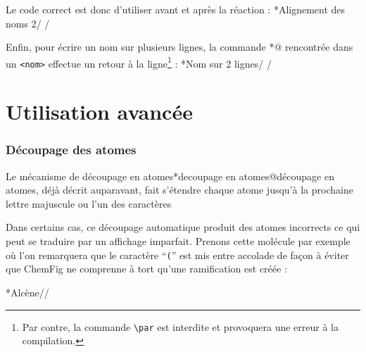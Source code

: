\documentclass[10pt]{article}
\makeatletter
\newcommand\idx{\@ifstar{\let\print@or@not\@gobble\idx@}{\let\print@or@not\@firstofone\idx@}}
\newcommand\idx@[1]{%
	\ifcat\expandafter\noexpand\@car#1\@nil\relax%
		\expandafter\ifx\@car#1\@nil\protect
			\index{#1}%
			\print@or@not{#1}%
		\else
			\saveexpandmode\expandarg
			\StrSubstitute{\string#1}{\string @}{\@empty\protect\symbol{'100}}[\temp@]%
			\StrGobbleLeft\temp@1[\temp@]%
			\restoreexpandmode
			\expandafter\index\expandafter{\temp@ @\protect\texttt{\protect\textbackslash\temp@}}%
			\print@or@not{\texttt{\string#1}}%
		\fi
	\else
		\index{#1}%
		\print@or@not{#1}%
	\fi
}
\newcommand\make@car@active[1]{%
	\catcode`#1\active
	\begingroup
		\lccode`\~`#1\relax
		\lowercase{\endgroup\def~}%
}
\newif\if@exstar
\newcommand\exemple{%
	\begingroup
	\parskip\z@
	\@makeother\;\@makeother\!\@makeother\?\@makeother\:%
	\@ifstar{\@exstartrue\exemple@}{\@exstarfalse\exemple@}}
\newcommand\exemple@[2][65]{%
	\medbreak\noindent
	\begingroup
		\let\do\@makeother\dospecials
		\make@car@active\ { {}}%
		\make@car@active\^^M{\par\leavevmode}%
		\make@car@active\,{\leavevmode\kern\z@\string,}%
		\make@car@active\-{\leavevmode\kern\z@\string-}%
		\make@car@active\>{\leavevmode\kern\z@\string>}%
		\make@car@active\<{\leavevmode\kern\z@\string<}%
		\exemple@@{#1}{#2}%
}
\newcommand\exemple@@[3]{%
	\def\@tempa##1#3{\exemple@@@{#1}{#2}{##1}}%
	\@tempa
}
\newcommand\exemple@@@[3]{%
	\xdef\the@code{#3}%
	\endgroup
	\if@exstar
		\begingroup
			\fboxrule0.4pt
			\let\breakboxparindent\z@
			\def\bkvz@bottom{\hrule\@height\fboxrule}%
			\let\bkvz@before@breakbox\relax
			\def\bkvz@set@linewidth{\advance\linewidth\dimexpr-2\fboxrule-2\fboxsep}%
			\def\bkvz@left{\vrule\@width\fboxrule\hskip\fboxsep}%
			\def\bkvz@right{\hskip\fboxsep\vrule\@width\fboxrule}%
			\def\bkvz@top{\hbox to \hsize{%
				\vrule\@width\fboxrule\@height\fboxrule
				\leaders\bkvz@bottom\hfill
				\ECFAugie
				\fboxsep\z@
				\colorbox{black}{\kern0.25em\color{white}\footnotesize\lower0.5ex\hbox{\strut#2}\kern0.25em}%
				\leaders\bkvz@bottom\hfill
				\vrule\@width\fboxrule\@height\fboxrule}}%
			\breakbox
				\kern.5ex\relax
				\ttfamily\footnotesize\the@code\par
				\normalfont
				\kern3pt
				\hrule height0.1pt width\linewidth depth0.1pt
				\vskip5pt
				\rightskip0pt plus 1fill
				\everypar{{\color{lightgray}\rlap{\vrule height0.1pt width\linewidth depth0.1pt}}\hskip0pt plus 1fill}%
				\newlinechar`\^^M\everyeof{\noexpand}\scantokens{#3}\par
			\endbreakbox
		\endgroup
	\else
		\vskip0.5ex
		\boxput*(0,1)
			{\fboxsep\z@
			\hbox{\ECFAugie\colorbox{black}{\leavevmode\kern0.25em{\color{white}\footnotesize\strut#2}\kern0.25em}}%
			}%
			{\fboxsep5pt
			\fbox{%
				$\vcenter{\hsize\dimexpr0.#1\linewidth-\fboxsep-\fboxrule\relax
					\kern5pt\parskip0pt \ttfamily\footnotesize\the@code}%
				\vcenter{\kern5pt\hsize\dimexpr\linewidth-0.#1\linewidth-\fboxsep-\fboxrule\relax
					\everypar{{\color{lightgray}\rlap{\vrule height0.1pt width\dimexpr\linewidth-0.#1\linewidth-\fboxsep-\fboxrule depth0.1pt}}}%
					\footnotesize\newlinechar`\^^M\everyeof{\noexpand}\scantokens{#3}}$%
				}%
			}%
	\fi
	\medbreak
	\endgroup
}
\newcommand\falseverb[1]{{\ttfamily\detokenize{#1}}}
\let\do\@makeother\dospecials
\newcommand\CF{{\ECFAugie ChemFig}\xspace}
\newcommand\boxedfalseverb[1]{{\fboxsep0pt\fbox{\vphantom|\falseverb{#1}}}}
\makeatother
\begin{document}
Le code correct est donc d'utiliser \idx{\chemnameinit} avant et après la réaction :
\exemple*{Alignement des noms 2}/
\chemsign{+}
\chemrel{->}
\chemsign{+}
\chemnameinit{}/

Enfin, pour écrire un nom sur plusieurs lignes, la commande \idx*{\protect{}\protect{}@\protect\texttt{\protect{}\protect{}}} rencontrée dans un \verb-<nom>- effectue un retour à la ligne\footnote{Par contre, la commande \texttt{\textbackslash par} est interdite et provoquera une erreur à la compilation.} :
\exemple*{Nom sur 2 lignes}/
\chemsign{+}
\chemrel{->}
\chemsign{+}
\chemnameinit{}/
\newpage

\part{Utilisation avancée}\label{utilisation.avancee}
\section{Découpage des atomes}\label{decoupage.atomes}
Le mécanisme de découpage en atomes\idx*{decoupage en atomes@découpage en atomes}, déjà décrit auparavant, fait s'étendre chaque atome jusqu'à la prochaine lettre majuscule ou l'un des caractères {\ttfamily \boxedfalseverb{-} \boxedfalseverb{=} \boxedfalseverb{~} \boxedfalseverb{(} \boxedfalseverb{!} \boxedfalseverb{*} \boxedfalseverb{<} \boxedfalseverb{>} \boxedfalseverb{@}}

Dans certains cas, ce découpage automatique produit des atomes incorrects ce qui peut se traduire par un affichage imparfait. Prenons cette molécule par exemple où l'on remarquera que le caractère ``\texttt('' est mis entre accolade de façon à éviter que \CF ne comprenne à tort qu'une ramification est créée :

\exemple*{Alcène}//
\end{document}
